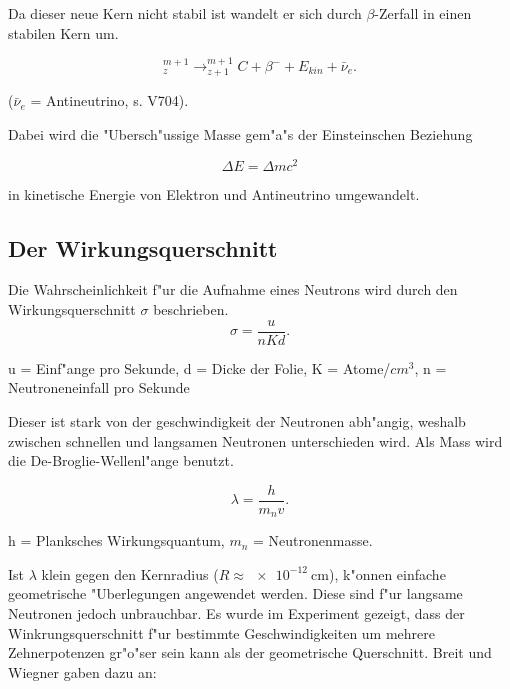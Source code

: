 			Da dieser neue Kern nicht stabil ist wandelt er sich durch $\beta$-Zerfall in einen stabilen Kern um. 

			\begin{equation*}
				^{m+1}_z \rightarrow ^{m+1}_{z+1}C + \beta^- + E_{kin} + \bar{\nu}_e.
			\end{equation*}

			\begin{center}
				\tiny{($\bar{\nu}_e$ = Antineutrino, s. V704).}
			\end{center}

			Dabei wird die "Ubersch"ussige Masse gem"a"s der Einsteinschen Beziehung 

			\begin{equation*}
				\Delta E = \Delta m c^2
			\end{equation*}

			in kinetische Energie von Elektron und Antineutrino umgewandelt.

		\subsection{Der Wirkungsquerschnitt}
		\label{sub:der_wirkungsquerschnitt}
		
			Die Wahrscheinlichkeit f"ur die Aufnahme eines Neutrons wird durch den Wirkungsquerschnitt $\sigma$ beschrieben.
			\newpage
			\begin{equation*}
				\sigma = \frac{u}{nKd}.
			\end{equation*}

			\begin{center}
					\tiny{u = Einf"ange pro Sekunde, d = Dicke der Folie,
					K = Atome/$cm^3$, n = Neutroneneinfall pro Sekunde}
			\end{center}

			Dieser ist stark von der geschwindigkeit der Neutronen abh"angig, weshalb zwischen schnellen und langsamen Neutronen unterschieden wird.
			Als Mass wird die De-Broglie-Wellenl"ange benutzt.

			\begin{equation*}
				\lambda = \frac{h}{m_n v}.
			\end{equation*}

			\begin{center}
					\tiny{h = Planksches Wirkungsquantum, $m_n$ = Neutronenmasse}.
			\end{center}

			Ist $\lambda$ klein gegen den Kernradius ($R \approx \SI{e-12}{\centi\meter}$), k"onnen einfache geometrische "Uberlegungen angewendet werden.
			Diese sind f"ur langsame Neutronen jedoch unbrauchbar.
			Es wurde im Experiment gezeigt, dass der Winkrungsquerschnitt f"ur bestimmte Geschwindigkeiten um mehrere Zehnerpotenzen gr"o"ser sein kann als der geometrische Querschnitt.
			Breit und Wiegner gaben dazu an:

